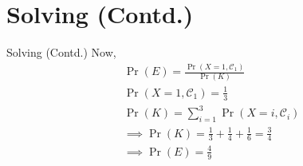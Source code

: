 \documentclass{beamer}
\providecommand{\pr}[1]{\ensuremath{\Pr\left(#1\right)}}
\begin{document}
\section{Solving (Contd.)}
\begin{frame}{Solving (Contd.)}
Now,
\begin{align}
   & \pr{E} = \frac{\pr{X = 1 , \mathcal{C}_1}}{\pr{K}} \\
    &\pr{X = 1 , \mathcal{C}_1} = \frac{1}{3} \\
    &\pr{K} = \sum_{i = 1}^{3}{\pr{X = i , \mathcal{C}_i}} \\
    &\implies \pr{K} = \frac{1}{3} + \frac{1}{4} + \frac{1}{6} = \frac{3}{4} \\
    &\implies \pr{E} = \frac{4}{9}
\end{align}
\end{frame}
\end{document}
